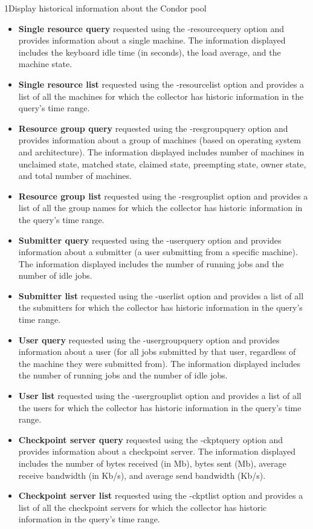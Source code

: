 \begin{ManPage}{}{1}{Display historical information about the Condor pool}
\begin{itemize}
	\item \textbf{Single resource query} requested using the -resourcequery option and provides
	       information about a single machine. The information displayed includes the keyboard
	       idle time (in seconds), the load average, and the machine state.
	\item \textbf{Single resource list} requested using the -resourcelist option and provides
	       a list of all the machines for which the collector has historic information in
	       the query's time range.
	\item \textbf{Resource group query} requested using the -resgroupquery option and provides
	       information about a group of machines (based on operating system and architecture).
	       The information displayed includes number of machines in unclaimed state, matched
	       state, claimed state, preempting state, owner state, and total number of machines.
	\item \textbf{Resource group list} requested using the -resgrouplist option and provides
	       a list of all the group names for which the collector has historic information in
	       the query's time range.
	\item \textbf{Submitter query} requested using the -userquery option and provides
	       information about a submitter (a user submitting from a specific machine). 
	       The information displayed includes the number of running jobs and the number of idle jobs.
	\item \textbf{Submitter list} requested using the -userlist option and provides
	       a list of all the submitters for which the collector has historic information in
	       the query's time range.
	\item \textbf{User query} requested using the -usergroupquery option and provides
	       information about a user (for all jobs submitted by that user, regardless of
	       the machine they were submitted from). 
	       The information displayed includes the number of running jobs and the number of idle jobs.
	\item \textbf{User list} requested using the -usergrouplist option and provides
	       a list of all the users for which the collector has historic information in
	       the query's time range.
	\item \textbf{Checkpoint server query} requested using the -ckptquery option and provides
	       information about a checkpoint server. The information displayed includes the
	       number of bytes received (in Mb), bytes sent (Mb), average receive bandwidth (in Kb/s),
	       and average send bandwidth (Kb/s).
	\item \textbf{Checkpoint server list} requested using the -ckptlist option and provides
	       a list of all the checkpoint servers for which the collector has historic information in
	       the query's time range.
\end{itemize}


\end{ManPage}
